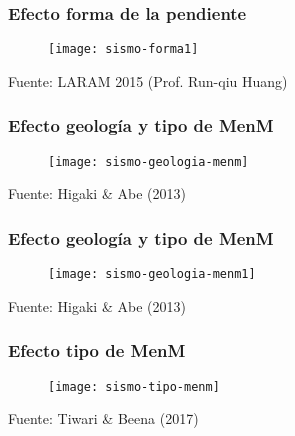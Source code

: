 \documentclass[12pt]{beamer}
\begin{document}
\begin{frame}
\frametitle{Efecto forma de la pendiente}
\begin{figure}
\centering
\texttt{[image: sismo-forma1]} 
\end{figure}
\tiny{Fuente: LARAM 2015 (Prof. Run-qiu Huang) }
\end{frame}
\begin{frame}
\frametitle{Efecto geología y tipo de MenM}
\begin{figure}
\centering
\texttt{[image: sismo-geologia-menm]} 
\end{figure}
\tiny{Fuente: Higaki \& Abe (2013)}
\end{frame}
\begin{frame}
\frametitle{Efecto geología y tipo de MenM}
\begin{figure}
\centering
\texttt{[image: sismo-geologia-menm1]} 
\end{figure}
\tiny{Fuente: Higaki \& Abe (2013)}
\end{frame}
\begin{frame}
\frametitle{Efecto tipo de MenM}
\begin{figure}
\centering
\texttt{[image: sismo-tipo-menm]} 
\end{figure}
\tiny{Fuente: Tiwari \& Beena (2017)}
\end{frame}
\end{document}

